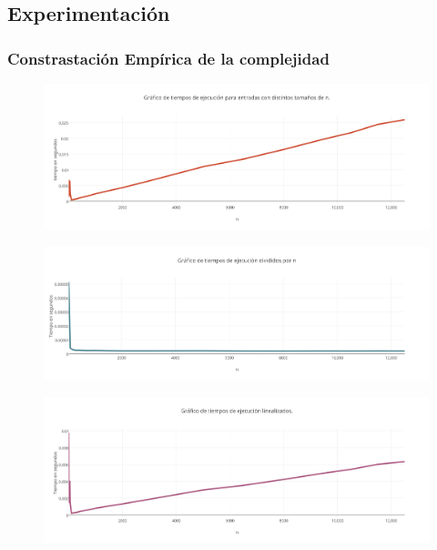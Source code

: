 	
\newpage
\subsection{Experimentaci\'on}

\subsubsection*{Constrastaci\'on Emp\'irica de la complejidad}



  \begin{figure}[h!]
   \begin{center}
 	\includegraphics[scale=0.15]{imagenes/ej2/grafiquitos/graf1.png}
   \end{center}
 \end{figure}
 
   \begin{figure}[h!]
   \begin{center}
 	\includegraphics[scale=0.15]{imagenes/ej2/grafiquitos/graf2.png}
   \end{center}
 \end{figure}
 
   \begin{figure}[h!]
   \begin{center}
 	\includegraphics[scale=0.15]{imagenes/ej2/grafiquitos/graf3.png}
   \end{center}
 \end{figure}